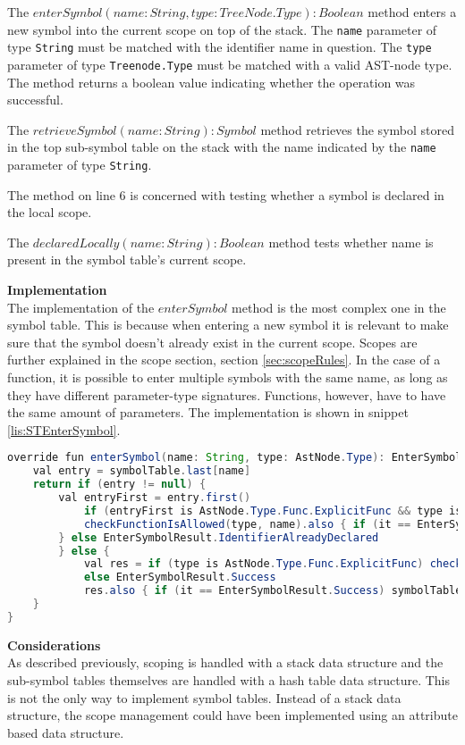 The $enterSymbol(name: String, type: TreeNode.Type): Boolean$ method enters a new symbol into the current scope on top of the stack.
The \texttt{name} parameter of type \texttt{String} must be matched with the identifier name in question.
The \texttt{type} parameter of type \texttt{Treenode.Type} must be matched with a valid AST-node type.
The method returns a boolean value indicating whether the operation was successful.

The $retrieveSymbol(name: String): Symbol$ method retrieves the symbol stored in the top sub-symbol table on the stack with the name indicated by the \texttt{name} parameter of type \texttt{String}.

The method on line 6 is concerned with testing whether a symbol is declared in the local scope.

The $declaredLocally(name: String): Boolean$ method tests whether name is present in the symbol table's current scope.

\textbf{Implementation}\\
The implementation of the $enterSymbol$ method is the most complex one in the symbol table. 
This is because when entering a new symbol it is relevant to make sure that the symbol doesn't already exist in the current scope.
Scopes are further explained in the scope section, section \ref{sec:scopeRules}.
In the case of a function, it is possible to enter multiple symbols with the same name, as long as they have different parameter-type signatures. 
Functions, however, have to have the same amount of parameters.
The implementation is shown in snippet \ref{lis:STEnterSymbol}.

\begin{lstlisting}[language=java,label=lis:STEnterSymbol,caption=Implementation of enterSymbol.]
override fun enterSymbol(name: String, type: AstNode.Type): EnterSymbolResult {
	val entry = symbolTable.last[name]
	return if (entry != null) {
		val entryFirst = entry.first()
			if (entryFirst is AstNode.Type.Func.ExplicitFunc && type is AstNode.Type.Func.ExplicitFunc) {
			checkFunctionIsAllowed(type, name).also { if (it == EnterSymbolResult.Success) entry.add(type) }
		} else EnterSymbolResult.IdentifierAlreadyDeclared
		} else {
			val res = if (type is AstNode.Type.Func.ExplicitFunc) checkFunctionIsAllowed(type, name)
			else EnterSymbolResult.Success
			res.also { if (it == EnterSymbolResult.Success) symbolTable.last[name] = mutableListOf(type) }
	}
}
\end{lstlisting}

\textbf{Considerations}\\
As described previously, scoping is handled with a stack data structure and the sub-symbol tables themselves are handled with a hash table data structure.
This is not the only way to implement symbol tables.
Instead of a stack data structure, the scope management could have been implemented using an attribute based data structure.

